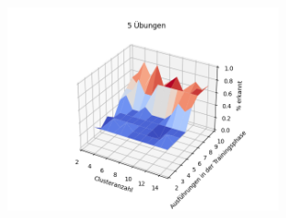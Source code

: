 \documentclass{article}
\begin{document}
\begin{figure}[htbp]
\centering
\includegraphics[width=0.7\textwidth]{figures/5_graph.png}
\end{figure}
\end{document}

